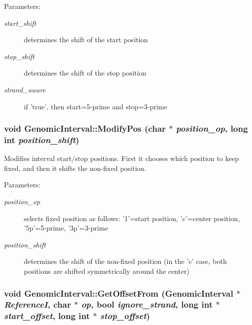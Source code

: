 \begin{Desc}
\item[Parameters:]
\begin{description}
\item[{\em start\_\-shift}]determines the shift of the start position \item[{\em stop\_\-shift}]determines the shift of the stop position \item[{\em strand\_\-aware}]if 'true', then start=5-prime and stop=3-prime \end{description}
\end{Desc}
\hypertarget{classGenomicInterval_96b34b76019001c4751d4c4f868ee24d}{
\subsubsection[ModifyPos]{\setlength{\rightskip}{0pt plus 5cm}void GenomicInterval::ModifyPos (char $\ast$ {\em position\_\-op}, \/  long int {\em position\_\-shift})}}
\label{classGenomicInterval_96b34b76019001c4751d4c4f868ee24d}


Modifies interval start/stop positions. First it chooses which position to keep fixed, and then it shifts the non-fixed position. 

\begin{Desc}
\item[Parameters:]
\begin{description}
\item[{\em position\_\-op}]selects fixed position as follows: '1'=start position, 'c'=center position, '5p'=5-prime, '3p'=3-prime \item[{\em position\_\-shift}]determines the shift of the non-fixed position (in the 'c' case, both positions are shifted symmetrically around the center) \end{description}
\end{Desc}
\hypertarget{classGenomicInterval_ab40ad7dd997948e0c04a13164e955d6}{
\subsubsection[GetOffsetFrom]{\setlength{\rightskip}{0pt plus 5cm}void GenomicInterval::GetOffsetFrom ({\bf GenomicInterval} $\ast$ {\em ReferenceI}, \/  char $\ast$ {\em op}, \/  bool {\em ignore\_\-strand}, \/  long int $\ast$ {\em start\_\-offset}, \/  long int $\ast$ {\em stop\_\-offset})}}
\label{classGenomicInterval_ab40ad7dd997948e0c04a13164e955d6}


